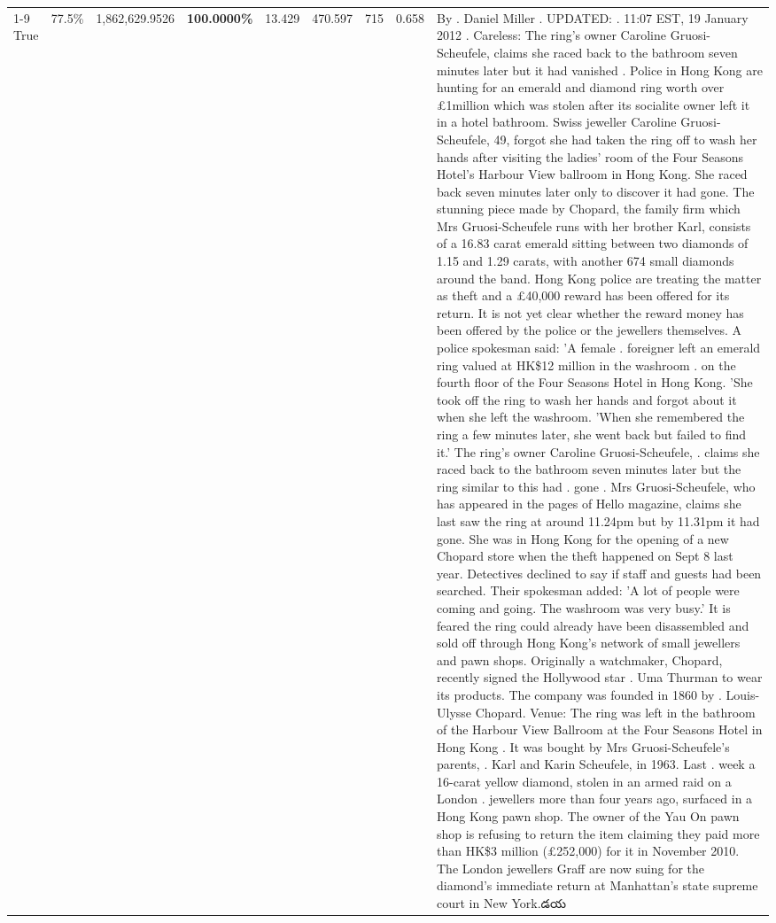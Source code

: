 \begin{table}[H]
\begin{tabular}{lllrlllll}
\cline{1-9}
True & 77.5\% & 1,862,629.9526 & \bfseries \color{red} 100.0000\% & 13.429 & 470.597 & 715 & 0.658 & By . Daniel Miller . UPDATED: . 11:07 EST, 19 January 2012 . Careless: The ring's owner Caroline Gruosi-Scheufele, claims she raced back to the bathroom seven minutes later but it had vanished . Police in Hong Kong are hunting for an emerald and diamond ring worth over £1million which was stolen after its socialite owner left it in a hotel bathroom. Swiss jeweller Caroline Gruosi-Scheufele, 49, forgot she had taken the ring off to wash her hands after visiting the ladies' room of the Four Seasons Hotel's Harbour View ballroom in Hong Kong. She raced back seven minutes later only to discover it had gone. The stunning piece made by Chopard, the family firm which Mrs Gruosi-Scheufele runs with her brother Karl, consists of a 16.83 carat emerald sitting between two diamonds of 1.15 and 1.29 carats, with another 674 small diamonds around the band. Hong Kong police are treating the matter as theft and a £40,000 reward has been offered for its return. It is not yet clear whether the reward money has been offered by the police or the jewellers themselves. A police spokesman said: 'A female . foreigner left an emerald ring valued at HK\$12 million in the washroom . on the fourth floor of the Four Seasons Hotel in Hong Kong. 'She took off the ring to wash her hands and forgot about it when she left the washroom. 'When she remembered the ring a few minutes later, she went back but failed to find it.' The ring's owner Caroline Gruosi-Scheufele, . claims she raced back to the bathroom seven minutes later but the ring similar to this had . gone . Mrs Gruosi-Scheufele, who has appeared in the pages of Hello magazine, claims she last saw the ring at around 11.24pm but by 11.31pm it had gone. She was in Hong Kong for the opening of a new Chopard store when the theft happened on Sept 8 last year. Detectives declined to say if staff and guests had been searched. Their spokesman added: 'A lot of people were coming and going. The washroom was very busy.' It is feared the ring could already have been disassembled and sold off through Hong Kong's network of small jewellers and pawn shops. Originally a watchmaker, Chopard, recently signed the Hollywood star . Uma Thurman to wear its products. The company was founded in 1860 by . Louis-Ulysse Chopard. Venue: The ring was left in the bathroom of the Harbour View Ballroom at the Four Seasons Hotel in Hong Kong . It was bought by Mrs Gruosi-Scheufele's  parents, . Karl and Karin Scheufele, in 1963. Last . week a 16-carat yellow diamond, stolen in an armed raid on a London . jewellers more than four years ago, surfaced in a Hong Kong pawn shop. The owner of the Yau On pawn shop is refusing to return the item claiming they paid more than HK\$3 million (£252,000) for it in November 2010. The London jewellers Graff are now suing for the diamond’s immediate return at Manhattan’s state supreme court in New York.డయ \\

\end{tabular}
\end{table}
